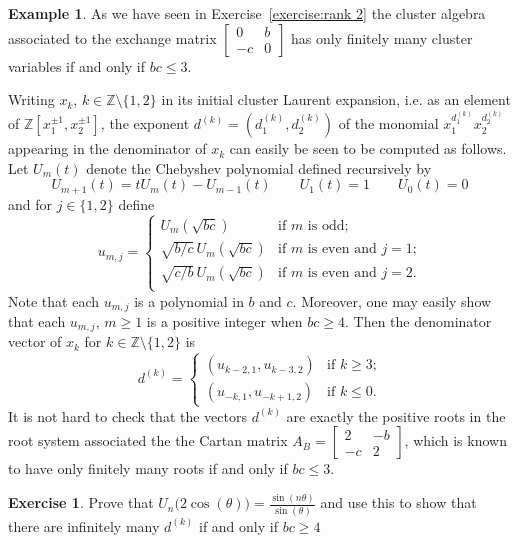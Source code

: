 \documentclass{amsart}
\theoremstyle{definition}
\newtheorem{example}[theorem]{Example}
\newtheorem{subexercise}{Exercise}[theorem]
\theoremstyle{remark}
\numberwithin{equation}{section}
\newcommand{\ZZ}{{\mathbb{Z}}}
\begin{document}
  \begin{example}
    As we have seen in Exercise~\ref{exercise:rank 2} the cluster algebra associated to the exchange matrix $\left[\begin{array}{cc}0 & b\\ -c & 0\end{array}\right]$ has only finitely many cluster variables if and only if $bc\le3$.  

    Writing $x_k$, $k\in\ZZ\setminus\{1,2\}$ in its initial cluster Laurent expansion, i.e. as an element of $\ZZ[x_1^{\pm1},x_2^{\pm1}]$, the exponent $d^{(k)}=(d_1^{(k)},d_2^{(k)})$ of the monomial $x_1^{d^{(k)}_1}x_2^{d^{(k)}_2}$ appearing in the denominator of $x_k$ can easily be seen to be computed as follows.  Let $U_m(t)$ denote the Chebyshev polynomial defined recursively by 
    \[U_{m+1}(t)=tU_m(t)-U_{m-1}(t)\qquad U_1(t)=1\qquad U_0(t)=0\]
    and for $j\in\{1,2\}$ define 
    \[u_{m,j}=\begin{cases}U_m(\sqrt{bc}) & \text{if $m$ is odd;}\\\sqrt{b/c}\,U_m(\sqrt{bc}) & \text{if $m$ is even and $j=1$;}\\\sqrt{c/b}\,U_m(\sqrt{bc}) & \text{if $m$ is even and $j=2$.}\\\end{cases}\]
    Note that each $u_{m,j}$ is a polynomial in $b$ and $c$.  Moreover, one may easily show that each $u_{m,j}$, $m\ge1$ is a positive integer when $bc\ge4$.  Then the denominator vector of $x_k$ for $k\in\ZZ\setminus\{1,2\}$ is
    \begin{equation}\label{eq:rank 2 denominators}
      d^{(k)}=\begin{cases}(u_{k-2,1},u_{k-3,2}) & \text{if $k\ge3$;}\\(u_{-k,1},u_{-k+1,2}) & \text{if $k\le0$.}\end{cases}
    \end{equation}
    It is not hard to check that the vectors $d^{(k)}$ are exactly the positive roots in the root system associated the the Cartan matrix $A_B=\left[\begin{array}{cc} 2 & -b\\ -c & 2\end{array}\right]$, which is known to have only finitely many roots if and only if $bc\le3$.
    \begin{subexercise}
      Prove that $U_n\big(2\cos(\theta)\big)=\frac{\sin(n\theta)}{\sin(\theta)}$ and use this to show that there are infinitely many $d^{(k)}$ if and only if $bc\ge4$
    \end{subexercise}
  \end{example}
\end{document}
